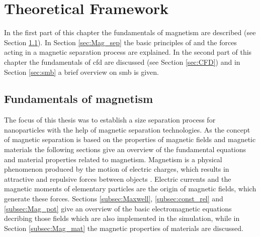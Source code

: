

\chapter{Theoretical Framework}
\label{chap:chap_theo}


In the first part of this chapter the fundamentals of magnetism are described (see Section \ref{sec:Fund_mag}). In Section \ref{sec:Mag_sep} the basic principles of and the forces acting in a magnetic separation process are explained.
In the second part of this chapter the fundamentals of \gls{cfd} are discussed (see Section \ref{sec:CFD}) and in Section \ref{sec:smb} a brief overview on \gls{smb} is given.  

\section{Fundamentals of magnetism}
\label{sec:Fund_mag}
The focus of this thesis was to establish a size separation process for nanoparticles with the help of magnetic separation technologies. As the concept of magnetic separation is based on the properties of magnetic fields and magnetic materials the following sections give an overview of the fundamental equations and material properties related to magnetism. Magnetism is a physical phenomenon produced by the motion of electric charges, which results in attractive and repulsive forces between objects \cite{stevenson2010oxford}. Electric currents and the magnetic moments of elementary particles are the origin of magnetic fields, which generate these forces. Sections \ref{subsec:Maxwell}, \ref{subsec:const_rel} and \ref{subsec:Mag_pot} give an overview of the basic electromagnetic equations decribing those fields which are also implemented in the simulation, while in Section \ref{subsec:Mag_mat} the magnetic properties of materials are discussed.

